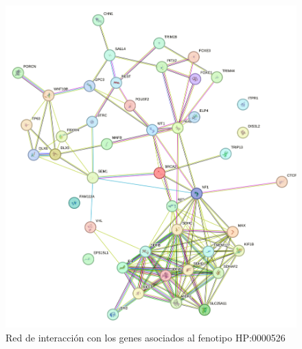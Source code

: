 \begin{figure}[h] %
	\centering
	\includegraphics[width=1\textwidth]{figures/red_interaccion_aniridia.png} %
	\caption{Red de interacción con los genes asociados al fenotipo HP:0000526} %
	\label{fig:mi-imagen} %
\end{figure}


